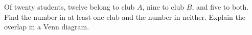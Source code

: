 Of twenty students, twelve belong to club $ A $, nine to club $ B $, and five to both. Find the number in at least one club and the number in neither. Explain the overlap in a Venn diagram.
